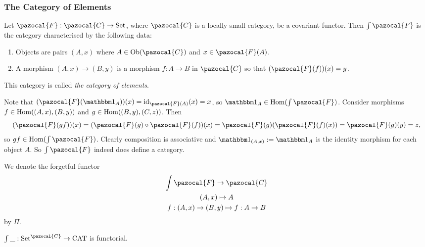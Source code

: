 \subsubsection{The Category of Elements}
\begin{definition}
    Let $\pazocal{F}: \pazocal{C}\rightarrow\mathrm{Set}$, where $\pazocal{C}$ is a locally small category, be a covariant functor. Then $\int \pazocal{F}$ is the category characterised by the following data: 
    \begin{enumerate}
        \item Objects are pairs $(A,x)$ where $A\in \Ob(\pazocal{C})$ and $x\in \pazocal{F}(A)$.
        \item A morphism $(A,x)\rightarrow (B,y)$ is a morphism $f: A\rightarrow B$ in $\pazocal{C}$ so that $(\pazocal{F}(f))(x)=y$.
    \end{enumerate} 
    This category is called \emph{the category of elements}.
\end{definition}
\begin{remark}
    Note that $(\pazocal{F}(\fone_A))(x)=\id_{\pazocal{F}(A)}(x)=x$, so $\fone_A\in \Hom(\int\pazocal{F})$. Consider morphisms $f\in \mathrm{Hom}((A,x),(B,y))$ and $g\in \mathrm{Hom}((B,y),(C,z))$. Then 
    $$(\pazocal{F}(gf))(x)=(\pazocal{F}(g)\circ \pazocal{F}(f))(x)= \pazocal{F}(g)(\pazocal{F}(f)(x))=\pazocal{F}(g)(y)=z,$$
    so $gf\in \Hom(\int\pazocal{F})$. Clearly composition is associative and $\fone_{(A,x)}:=\fone_A$ is the identity morphism for each object $A$. So $\int\pazocal{F}$ indeed does define a category.
\end{remark}
We denote the forgetful functor 
\begin{gather*}
    \int\pazocal{F} \rightarrow \pazocal{C}\\
    (A,x)\mapsto A\\
    f: (A,x)\rightarrow (B,y) \mapsto f: A\rightarrow B
\end{gather*}
by $\Pi$. 
\begin{lemma}
    $\int \_ : \mathrm{Set}^{\pazocal{C}}\rightarrow \mathrm{CAT}$ is functorial. 
\end{lemma}

